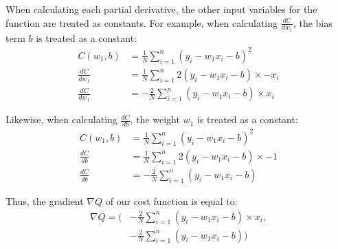 \documentclass[12pt]{article}
\begin{document}
When calculating each partial derivative, the other input variables for the function are treated as constants. For example, when calculating $\frac{dC}{dw_1}$, the bias term $b$ is treated as a constant:
\begin{align*}
	C(w_1, b)       & = \frac{1}{N} \sum_{i=1}^{n} (y_i - w_1x_i - b)^2
	\\
	\frac{dC}{dw_1} & = \frac{1}{N} \sum_{i=1}^{n} 2(y_i - w_1x_i - b) \times -x_i
	\\
	\frac{dC}{dw_1} & = -\frac{2}{N} \sum_{i=1}^{n} (y_i - w_1x_i - b) \times x_i
\end{align*}

Likewise, when calculating $\frac{dC}{db}$, the weight $w_1$ is treated as a constant:
\begin{align*}
	C(w_1, b)     & = \frac{1}{N} \sum_{i=1}^{n} (y_i - w_1x_i - b)^2
	\\
	\frac{dC}{db} & = \frac{1}{N} \sum_{i=1}^{n} 2(y_i - w_1x_i - b) \times -1
	\\
	\frac{dC}{db} & = -\frac{2}{N} \sum_{i=1}^{n} (y_i - w_1x_i - b)
\end{align*}

Thus, the gradient $\nabla Q$ of our cost function is equal to:
\begin{align*}
	\nabla Q = \Big(
	 &
	-\frac{2}{N} \sum_{i=1}^{n} (y_i - w_1x_i - b) \times x_i,
	\\
	 & -\frac{2}{N} \sum_{i=1}^{n} (y_i - w_1x_i - b)
	\Big)
\end{align*}


\end{document}
